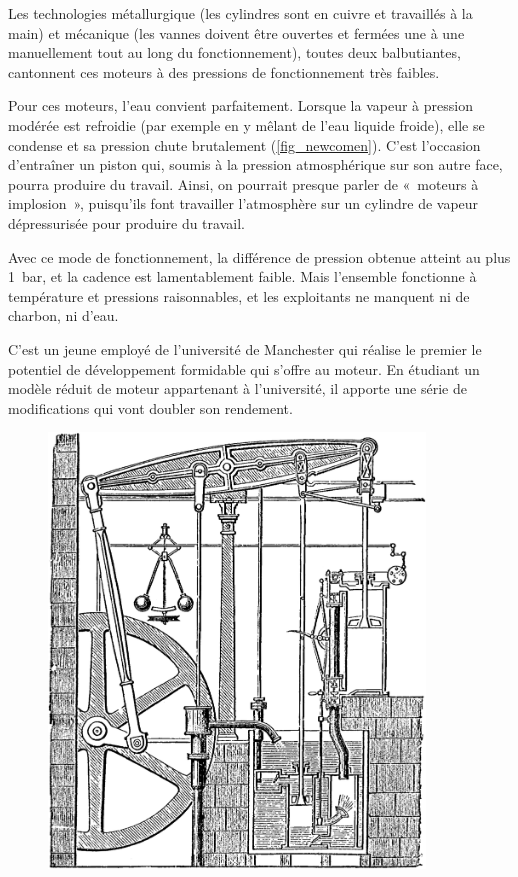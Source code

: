 	Les technologies métallurgique (les cylindres sont en cuivre et travaillés à la main) et mécanique (les vannes doivent être ouvertes et fermées une à une manuellement tout au long du fonctionnement), toutes deux balbutiantes, cantonnent ces moteurs à des pressions de fonctionnement très faibles.

	Pour ces moteurs, l’eau convient parfaitement. Lorsque la vapeur à pression modérée est refroidie (par exemple en y mêlant de l’eau liquide froide), elle se condense et sa pression chute brutalement (\cref{fig_newcomen}). C’est l’occasion d’entraîner un piston qui, soumis à la pression atmosphérique sur son autre face, pourra produire du travail. Ainsi, on pourrait presque parler de «~moteurs à implosion~», puisqu’ils font travailler l’atmosphère sur un cylindre de vapeur dépressurisée pour produire du travail.

	Avec ce mode de fonctionnement, la différence de pression obtenue atteint au plus \SI{1}{\bar}, et la cadence est lamentablement faible. Mais l’ensemble fonctionne à température et pressions raisonnables, et les exploitants ne manquent ni de charbon, ni d’eau.

	C’est un jeune employé de l’université de Manchester qui réalise le premier le potentiel de développement formidable qui s’offre au moteur. En étudiant un modèle réduit de moteur appartenant à l’université, il apporte une série de modifications qui vont doubler son rendement.

	\begin{figure}
	\begin{center}
		\includegraphics[width=10cm]{images/steam_engine_boulton_watt.png}
	\end{center}
	\label{fig_boultonwattengine}
	\end{figure}

